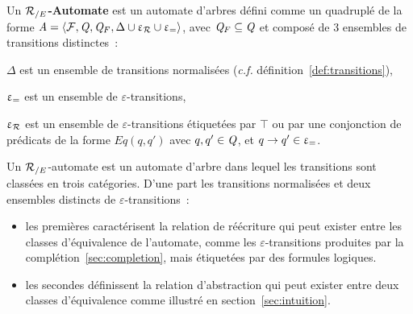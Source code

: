\begin{definition}
  \label{def:re-automaton}
  Un \textbf{${\mathcal R_{/E}}$-Automate} est un automate d'arbres défini comme un quadruplé de la forme
  $\mathit A= \langle \mathcal{F}, \mathit Q, \mathit Q_F,\Delta \cup \upvarepsilon_{\mathcal R} \cup \upvarepsilon_{=}\rangle$,
  avec $\mathit Q_F \subseteq \mathit Q$ et composé de 3 ensembles de transitions distinctes~:

  \begin{description}
  \item $\Delta$ est un ensemble de transitions normalisées (\textit{c.f.} définition~\ref{def:transitions}),
  \item $\upvarepsilon_{=}$ est un ensemble de $\varepsilon$-transitions,
  \item $\upvarepsilon_{\mathcal R}$ est un ensemble de 
  $\varepsilon$-transitions étiquetées par $\top$ ou par une conjonction de prédicats de la forme $Eq(q, q')$ 
  avec $q, q' \in \mathit Q$, et $q \rightarrow q' \in \upvarepsilon_{=}$.
  \end{description}
\end{definition}


Un ${\mathcal R_{/E}}$-automate est un automate d'arbre dans lequel les transitions sont classées en trois catégories.  D'une part les
transitions normalisées et deux ensembles distincts de $\varepsilon$-transitions~:
\begin{itemize}
\item les premières caractérisent la relation de réécriture qui peut exister entre les classes
  d'équivalence de l'automate, comme les $\varepsilon$-transitions produites par la complétion~\ref{sec:completion}, 
  mais étiquetées par des formules logiques.

\item les secondes définissent la relation d'abstraction qui peut exister entre deux classes d'équivalence comme illustré en 
  section~\ref{sec:intuition}.
\end{itemize}







